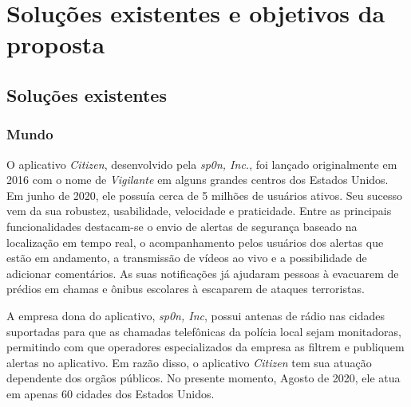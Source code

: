 \chapter{Soluções existentes e objetivos da proposta}
\label{c.solucoes-existentes-e-objetivos}

\section{Soluções existentes}
\label{c.solucoes-existentes}


\subsection{Mundo}
\label{ss.mundo}

O aplicativo \emph{Citizen}, desenvolvido pela \emph{sp0n, Inc.}, foi lançado originalmente em 2016 com o nome de \emph{Vigilante} em alguns grandes centros dos Estados Unidos. Em junho de 2020, ele possuía cerca de 5 milhões de usuários ativos. Seu sucesso vem da sua robustez, usabilidade, velocidade e praticidade. Entre as principais funcionalidades destacam-se o envio de alertas de segurança baseado na localização em tempo real, o acompanhamento pelos usuários dos alertas que estão em andamento, a transmissão de vídeos ao vivo e a possibilidade de adicionar comentários. As suas notificações já ajudaram pessoas à evacuarem de prédios em chamas e ônibus escolares à escaparem de ataques terroristas. 

A empresa dona do aplicativo, \emph{sp0n, Inc}, possui antenas de rádio nas cidades suportadas para que as chamadas telefônicas da polícia local sejam monitadoras, permitindo com que operadores especializados da empresa as filtrem e publiquem alertas no aplicativo. Em razão disso, o aplicativo \emph{Citizen} tem sua atuação dependente dos orgãos públicos. No presente momento, Agosto de 2020, ele atua em apenas 60 cidades dos Estados Unidos.

